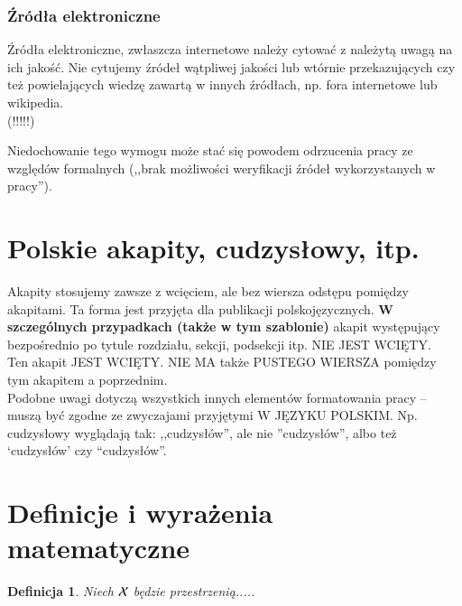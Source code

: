 \documentclass[12pt]{report}
\newtheorem{definition}{Definicja}
\begin{document}
\subsubsection{Źródła elektroniczne}
Źródła elektroniczne, zwłaszcza internetowe należy cytować z należytą uwagą na
ich jakość. Nie cytujemy źródeł wątpliwej jakości lub wtórnie przekazujących
czy też powielających wiedzę zawartą w innych źródłach, np. fora internetowe lub
wikipedia.\\
 (!!!!!)

Niedochowanie tego wymogu może stać się powodem odrzucenia pracy ze wzglę\-dów
formalnych (,,brak możliwości weryfikacji źródeł wykorzystanych w pracy''). 

\section{Polskie akapity, cudzysłowy, itp.}
Akapity stosujemy zawsze z wcięciem, ale bez wiersza odstępu pomiędzy akapitami. 
Ta forma jest przyjęta dla publikacji polskojęzycznych. {\bf W szczególnych
przypadkach (także w tym szablonie)} akapit występujący bezpośrednio po tytule
rozdziału, sekcji, podsekcji itp. NIE JEST WCIĘTY.\\
\indent Ten akapit JEST WCIĘTY. NIE MA także PUSTEGO WIERSZA pomiędzy tym
akapitem a poprzednim. \\
\indent Podobne uwagi dotyczą wszystkich innych elementów formatowania pracy --
muszą być zgodne ze zwyczajami przyjętymi W JĘZYKU POLSKIM.	Np. cu\-dzysłowy
wyglądają tak: ,,cudzysłów'', ale nie ''cudzysłów'', albo też `cudzysłów' czy
``cudzysłów''. 



\section{Definicje i wyrażenia matematyczne}
\begin{definition} \label{def.definicja1}
Niech $\cal X$ będzie przestrzenią.....
\end{definition}
\end{document}
